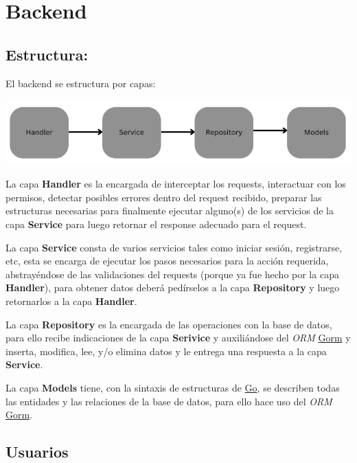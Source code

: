 \section{Backend}

\subsection{Estructura:}
El backend se estructura por capas:
\newline

\includegraphics[width=13.8cm, height=2.5cm]{structure_backend.png}

La capa \textbf{Handler} es la encargada de interceptar los requests, interactuar con los permisos, detectar posibles errores dentro del request recibido, preparar las estructuras necesarias para finalmente ejecutar alguno(s) de los servicios de la capa \textbf{Service} para luego retornar el response adecuado para el request.
\newline

La capa \textbf{Service} consta de varios servicios tales como iniciar sesión, registrarse, etc, esta se encarga de ejecutar los pasos necesarios para la acción requerida, abstrayéndose de las validaciones del requests (porque ya fue hecho por la capa \textbf{Handler}), para obtener datos deberá pedírselos a la capa \textbf{Repository} y luego retornarlos a la capa \textbf{Handler}.
\newline

La capa \textbf{Repository} es la encargada de las operaciones con la base de datos, para ello recibe indicaciones de la capa \textbf{Serivice} y auxiliándose del \textit{ORM} \href{gorm.io}{Gorm} y inserta, modifica, lee, y/o elimina datos y le entrega una respuesta a la capa \textbf{Service}.
\newline

La capa \textbf{Models} tiene, con la sintaxis de estructuras de \href{go.dev}{Go}, se describen todas las entidades y las relaciones de la base de datos, para ello hace uso del \textit{ORM} \href{gorm.io}{Gorm}.

\subsection{Usuarios}

